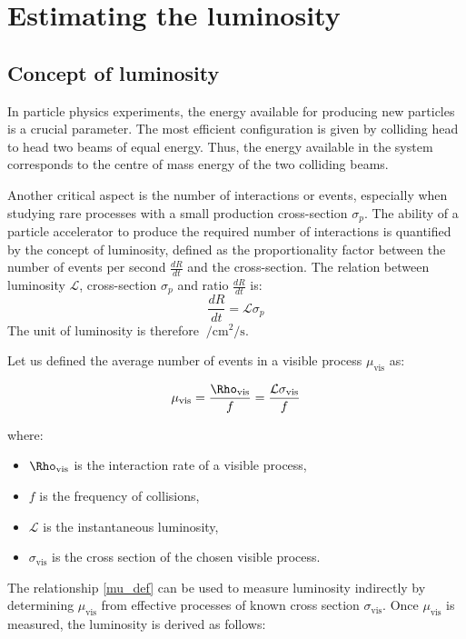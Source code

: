 \chapter{Estimating the luminosity}\label{chap:luminosity}

\section{Concept of luminosity}
In particle physics experiments, the energy available for producing new particles is a crucial parameter. The most efficient configuration is given by colliding head to head two beams of equal energy. Thus, the energy available in the system corresponds to the centre of mass energy of the two colliding beams.

Another critical aspect is the number of interactions or events, especially when studying rare processes with a small production cross-section $\sigma_p$. The ability of a particle accelerator to produce the required number of interactions is quantified by the concept of luminosity, defined as the proportionality factor between the number of events per second $\tfrac{dR}{dt}$ and the cross-section. The relation between luminosity $\mathcal{L}$, cross-section $\sigma_p$ and ratio $\tfrac{dR}{dt}$ is:
\begin{equation}
    \frac{dR}{dt} = \mathcal{L}{\sigma_p}\label{lumi_def}
\end{equation}
The unit of luminosity is therefore $\SI{}{\per\centi\meter\squared\per\second}$.
 
Let us defined the average number of events in a visible process $\mu_{\text{vis}}$ as:

\begin{equation}
\mu_{\text{vis}} = \frac{\Rho_{\text{vis}}}{f} = \frac{\mathcal{L} \sigma_{\text{vis}}}{f}\label{mu_def}
\end{equation}

where:
\begin{itemize}
\item  $\Rho_{\text{vis}}$ is the interaction rate of a visible process,
\item  $f$ is the frequency of collisions,
\item  $\mathcal{L}$ is the instantaneous luminosity,
\item  $\sigma_{\text{vis}}$ is the cross section of the chosen visible process.
\end{itemize}
The relationship \eqref{mu_def} can be used to measure luminosity indirectly by determining $\mu_{\text{vis}}$ from effective processes of known cross section $\sigma_\text{vis}$.
Once $\mu_{\text{vis}}$ is measured, the luminosity is derived as follows:

